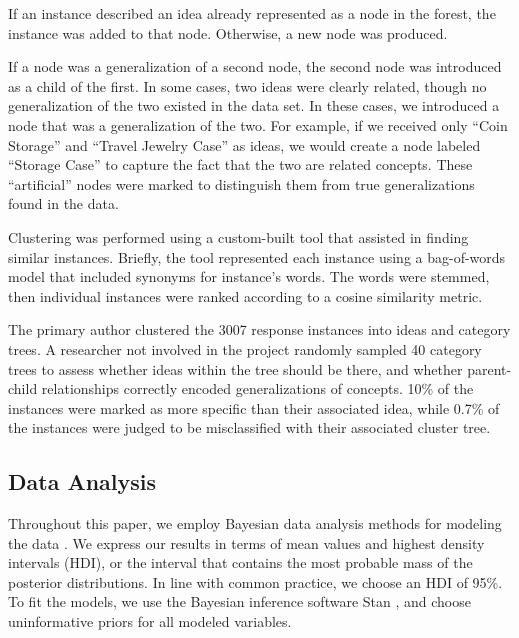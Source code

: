 If an instance described an idea already represented as a node in the forest, the instance was added to that node. Otherwise, a new node was produced.

If a node was a generalization of a second node, the second node was introduced as a child of the first. In some cases, two ideas were clearly related, though no generalization of the two existed in the data set. In these cases, we introduced a node that was a generalization of the two. For example, if we received only ``Coin Storage'' and ``Travel Jewelry Case'' as ideas, we would create a node labeled ``Storage Case'' to capture the fact that the two are related concepts. These ``artificial'' nodes were marked to distinguish them from true generalizations found in the data.

Clustering was performed using a custom-built tool that assisted in finding similar instances. Briefly, the tool represented each instance using a bag-of-words model that included synonyms for instance's words. The words were stemmed, then individual instances were ranked according to a cosine similarity metric.

The primary author clustered the 3007 response instances into ideas and category trees. A researcher not involved in the project randomly sampled 40 category trees to assess whether ideas within the tree should be there, and whether parent-child relationships correctly encoded generalizations of concepts. 10\% of the instances were marked as more specific than their associated idea, while 0.7\% of the instances were judged to be misclassified with their associated cluster tree.

\subsection{Data Analysis}
Throughout this paper, we employ Bayesian data analysis methods for modeling the data \cite{kruschke_doing_2010}. We express our results in terms of mean values and highest density intervals (HDI), or the interval that contains the most probable mass of the posterior distributions. In line with common practice, we choose an HDI of 95\%. To fit the models, we use the Bayesian inference software Stan \cite{stan-software:2013}, and choose uninformative priors for all modeled variables.



